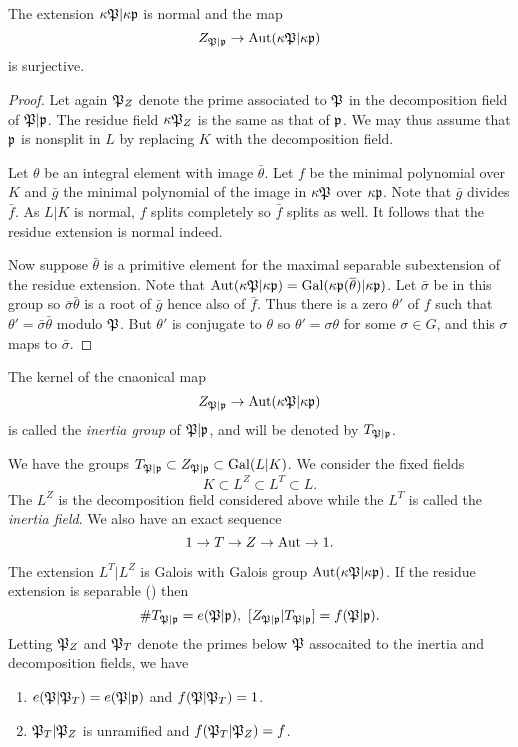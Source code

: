 \begin{proposition}
  The extension $\kappa\mathfrak{P}|\kappa\mathfrak{p}$ is normal and the map
  \[ Z_{\mathfrak{P}|\mathfrak{p}} \to \operatorname{Aut}(\kappa\mathfrak{P}|\kappa\mathfrak{p}) \]
  is surjective.
\end{proposition}
\begin{proof}
  Let again $\mathfrak{P}_{Z}$ denote the prime associated to $\mathfrak{P}$ in the decomposition field of $\mathfrak{P}|\mathfrak{p}$.
  The residue field $\kappa\mathfrak{P}_{Z}$ is the same as that of $\mathfrak{p}$.
  We may thus assume that $\mathfrak{p}$ is nonsplit in $L$ by replacing $K$ with the decomposition field.

  Let $\theta$ be an integral element with image $\bar \theta$.
  Let $f$ be the minimal polynomial over $K$ and $\bar g$ the minimal polynomial of the image in $\kappa\mathfrak{P}$ over $\kappa\mathfrak{p}$.
  Note that $\bar g$ divides $\bar f$.
  As $L|K$ is normal, $f$ splits completely so $\bar f$ splits as well.
  It follows that the residue extension is normal indeed.

  Now suppose $\bar\theta$ is a primitive element for the maximal separable subextension of the residue extension.
  Note that $\operatorname{Aut}(\kappa\mathfrak{P}|\kappa\mathfrak{p}) = \operatorname{Gal}(\kappa\mathfrak{p}(\overline\theta)|\kappa\mathfrak{p})$.
  Let $\bar\sigma$ be in this group so $\bar\sigma\bar\theta$ is a root of $\bar g$ hence also of $\bar f$.
  Thus there is a zero $\theta'$ of $f$ such that $\theta' = \bar\sigma\bar\theta$ modulo $\mathfrak{P}$.
  But $\theta'$ is conjugate to $\theta$ so $\theta' = \sigma\theta$ for some $\sigma \in G$, and this $\sigma$ maps to $\bar \sigma$.
\end{proof}

\begin{definition}
  The kernel of the cnaonical map
  \[ Z_{\mathfrak{P}|\mathfrak{p}} \to \operatorname{Aut}(\kappa\mathfrak{P}|\kappa\mathfrak{p}) \]
  is called the \emph{inertia group} of $\mathfrak{P}|\mathfrak{p}$, and will be denoted by $T_{\mathfrak{P}|\mathfrak{p}}$.
\end{definition}

We have the groups $T_{\mathfrak{P}|\mathfrak{p}} \subset Z_{\mathfrak{P}|\mathfrak{p}} \subset \operatorname{Gal}(L|K)$.
We consider the fixed fields
\[ K \subset L^{Z} \subset L^{T} \subset L. \]
The $L^{Z}$ is the decomposition field considered above while the $L^{T}$ is called the \emph{inertia field}.
We also have an exact sequence
\[ 1 \to T \to Z \to \operatorname{Aut} \to 1. \]

\begin{proposition}
  The extension $L^{T}|L^{Z}$ is Galois with Galois group $\operatorname{Aut}(\kappa\mathfrak{P}|\kappa\mathfrak{p})$.
  If the residue extension is separable () then
  \[ \# T_{\Pfrak|\pfrak} = e(\Pfrak|\pfrak), \ [Z_{\Pfrak|\pfrak}|T_{\Pfrak|\pfrak}] = f(\Pfrak|\pfrak). \]
  Letting $\mathfrak{P}_{Z}$ and $\mathfrak{P}_{T}$ denote the primes below $\mathfrak{P}$ assocaited to the inertia and decomposition fields, we have
  \begin{enumerate}
    \item $e(\mathfrak{P}|\mathfrak{P}_{T}) = e(\mathfrak{P}|\mathfrak{p})$ and $f(\mathfrak{P}|\mathfrak{P}_{T}) = 1$.
    \item $\mathfrak{P}_{T}|\mathfrak{P}_{Z}$ is unramified and $f(\mathfrak{P}_{T}|\mathfrak{P}_{Z}) = f$.
  \end{enumerate}
\end{proposition}

